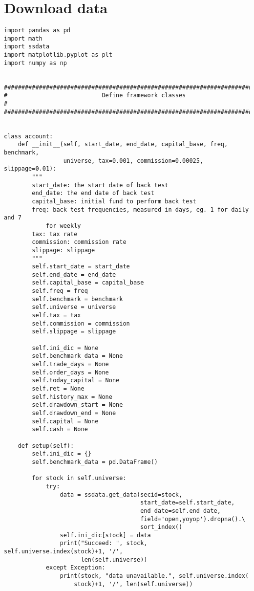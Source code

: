 \documentclass[11pt]{article}
\author{liushihao}
\date{\today}
\title{}
\begin{document}
\tableofcontents


\section{Download data}
\label{sec:org3f3d670}

\lstset{language=Python,label= ,caption= ,captionpos=b,numbers=none}
\begin{lstlisting}
import pandas as pd
import math
import ssdata
import matplotlib.pyplot as plt
import numpy as np


###############################################################################
#                           Define framework classes                          #
###############################################################################


class account:
    def __init__(self, start_date, end_date, capital_base, freq, benchmark,
                 universe, tax=0.001, commission=0.00025, slippage=0.01):
        """
        start_date: the start date of back test
        end_date: the end date of back test
        capital_base: initial fund to perform back test
        freq: back test frequencies, measured in days, eg. 1 for daily and 7
            for weekly
        tax: tax rate
        commission: commission rate
        slippage: slippage
        """
        self.start_date = start_date
        self.end_date = end_date
        self.capital_base = capital_base
        self.freq = freq
        self.benchmark = benchmark
        self.universe = universe
        self.tax = tax
        self.commission = commission
        self.slippage = slippage

        self.ini_dic = None
        self.benchmark_data = None
        self.trade_days = None
        self.order_days = None
        self.today_capital = None
        self.ret = None
        self.history_max = None
        self.drawdown_start = None
        self.drawdown_end = None
        self.capital = None
        self.cash = None

    def setup(self):
        self.ini_dic = {}
        self.benchmark_data = pd.DataFrame()

        for stock in self.universe:
            try:
                data = ssdata.get_data(secid=stock,
                                       start_date=self.start_date,
                                       end_date=self.end_date,
                                       field='open,yoyop').dropna().\
                                       sort_index()
                self.ini_dic[stock] = data
                print("Succeed: ", stock, self.universe.index(stock)+1, '/',
                      len(self.universe))
            except Exception:
                print(stock, "data unavailable.", self.universe.index(
                    stock)+1, '/', len(self.universe))


\end{lstlisting}
\end{document}
